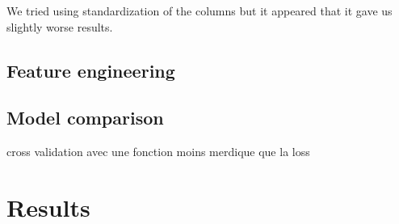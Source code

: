 \documentclass[10pt,conference,compsocconf]{IEEEtran}
\begin{document}
We tried using standardization of the columns but it appeared that it gave us slightly worse results.

\subsection{Feature engineering}
\subsection{Model comparison}
cross validation avec une fonction moins merdique que la loss




\section{Results}
\end{document}
